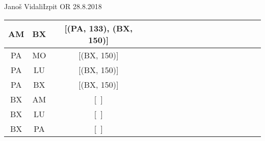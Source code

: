 \begin{naloga}{Janoš Vidali}{Izpit OR 28.8.2018}
\begin{odgovor}
\begin{tabela}
{\begin{tiny}
\begin{tabular}{c|c|c|c|c|c|c|c|c|c|c|c|c|c|c|c|c}
AM & BX & [(PA, 133), (BX, 150)] &  & & & & & & & & & & & & & \\ \hline
PA & MO & [(BX, 150)] &  & & & & & & & & & & & & & \\ \hline
PA & LU & [(BX, 150)] &  & & & & & & & & & & & & & \\ \hline
PA & BX & [(BX, 150)] &  & & & & & & & & & & & & & \\ \hline
BX & AM & [\ ] & & & & & & & & & & & & & & \\ \hline
BX & LU & [\ ] &  & & & & & & & & & & & & & \\ \hline
BX & PA & [\ ] &  & & & & & & & & & & & & &
\end{tabular}
\end{tiny}
}
\end{tabela}




\end{odgovor}
\end{naloga}

